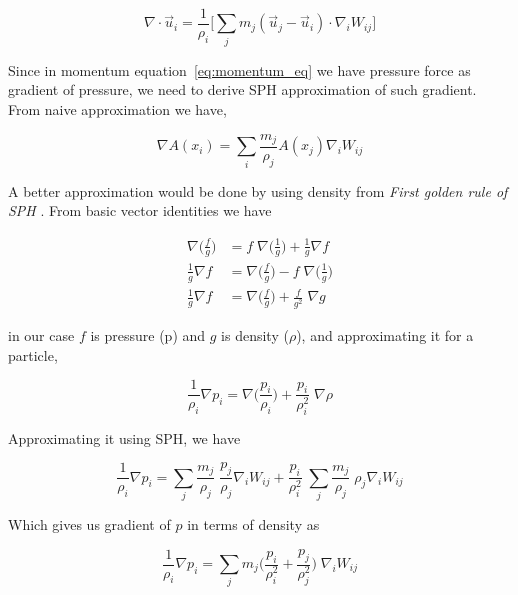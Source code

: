 \begin{equation}
  \label{eq:divergence_sph}
  \nabla \cdot \vec{u}_i = \frac{1}{\rho_i}
  \Big[ \sum_j {m_j} (\vec{u}_j - \vec{u}_i) \cdot \nabla_i W_{ij}
  \Big]
\end{equation}


Since in momentum equation~\ref{eq:momentum_eq} we have pressure force as gradient
of pressure, we need to derive SPH approximation of such gradient. From naive
approximation we have,


\begin{equation}
  \label{eq:df_app}
   \nabla A(x_i) = \sum_i \frac{m_j}{\rho_j} A(x_j) \nabla_i W_{ij}
\end{equation}


A better approximation would be done by using density from \textit{First golden rule
of SPH} \cite{monaghan-1992-smoot-partic-hydrod}.  From basic vector identities we
have

\begin{align*}
  \nabla \bigg( \frac{f}{g} \bigg) &= f\; \nabla \bigg(\frac{1}{g} \bigg) + \frac{1}{g} \nabla f \\
  \frac{1}{g} \nabla f &= \nabla \bigg( \frac{f}{g} \bigg) - f\; \nabla \bigg( \frac{1}{g} \bigg) \\
  \frac{1}{g} \nabla f &= \nabla \bigg( \frac{f}{g} \bigg) + \frac{f}{g^2} \; \nabla g
\end{align*}

in our case $f$ is pressure (p) and $g$ is density ($\rho$), and
approximating it for a particle,


\begin{equation*}
  \frac{1}{\rho_i} \nabla p_i = \nabla \big(\frac{p_i}{\rho_i} \big) + \frac{p_i}{\rho_i^2} \; \nabla \rho
\end{equation*}

Approximating it using SPH, we have

\begin{equation*}
  \frac{1}{\rho_i} \nabla p_i = \sum_j \frac{m_j}{\rho_j} \;
  \frac{p_j}{\rho_j} \nabla_i W_{ij} + \frac{p_i}{\rho_i^2} \; \sum_j
  \frac{m_j}{\rho_j} \; \rho_j \nabla_i W_{ij}
\end{equation*}

Which gives us gradient of $p$ in terms of density as


\begin{equation}
  \label{eq:df_sph}
  \frac{1}{\rho_i} \nabla p_i = \sum_j m_j \bigg(
  \frac{p_i}{\rho_i^2} + \frac{p_j}{\rho_j^2} \bigg)\;\nabla_i W_{ij}
\end{equation}



